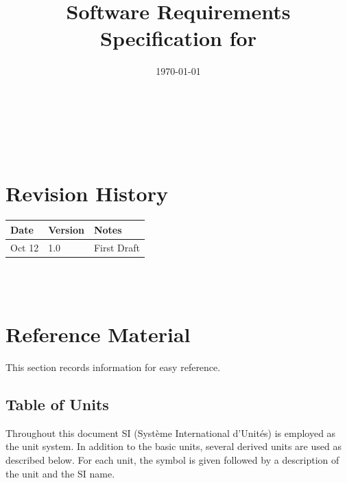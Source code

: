 \documentclass[12pt]{article}
\begin{document}
\title{Software Requirements Specification for \progname} 
\author{\authname}
\date{\today}
	
\maketitle

~\newpage


\tableofcontents

~\newpage

\section*{Revision History}

\begin{tabularx}{\textwidth}{p{3cm}p{2cm}X}
\toprule {\bf Date} & {\bf Version} & {\bf Notes}\\
\midrule
Oct 12 & 1.0 & First Draft\\
\bottomrule
\end{tabularx}

~\\

~\newpage

\section{Reference Material}

This section records information for easy reference.

\subsection{Table of Units}

Throughout this document SI (Syst\`{e}me International d'Unit\'{e}s) is employed
as the unit system.  In addition to the basic units, several derived units are
used as described below.  For each unit, the symbol is given followed by a
description of the unit and the SI name.
~\newline
\end{document}
